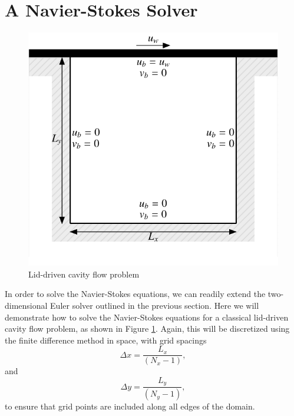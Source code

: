 \section{A Navier-Stokes Solver}
\begin{figure}[htbp]
	\centering
	\includegraphics[width=0.6\linewidth]{Pictures/cavity_flow}
	\caption{Lid-driven cavity flow problem}
	\label{fig:lidcavity}
\end{figure}
In order to solve the Navier-Stokes equations, we can readily extend the two-dimensional Euler solver outlined in the previous section. Here we will demonstrate how to solve the Navier-Stokes equations for a classical lid-driven cavity flow problem, as shown in Figure \ref{fig:lidcavity}. Again, this will be discretized using the finite difference method in space, with grid spacings
\begin{equation}
	\Delta x = \frac{L_x}{(N_x-1)},
\end{equation}
and
\begin{equation}
	\Delta y = \frac{L_y}{(N_y-1)},
\end{equation}
to ensure that grid points are included along all edges of the domain.

